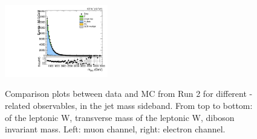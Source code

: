 \begin{figure}[htbp]
  \includegraphics[width=0.4\textwidth]{fig/controlPlots/SB_b1_e_allP_allC_allD_Run2_mWV.pdf}\\
  \caption{
    Comparison plots between data and MC from Run 2 for different \Wlep-related observables, in the jet mass sideband.
    From top to bottom: \pt of the leptonic W, transverse mass of the leptonic W, diboson invariant mass.
    Left: muon channel, right: electron channel.
  }
  \label{fig:SB_controlPlotsRun2_2}
\end{figure}

